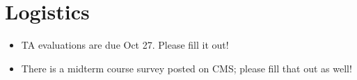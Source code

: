 \section{Logistics}

\begin{itemize}
\item TA evaluations are due Oct 27.  Please fill it out!
\item There is a midterm course survey posted on CMS; please fill that out
  as well!
\end{itemize}
